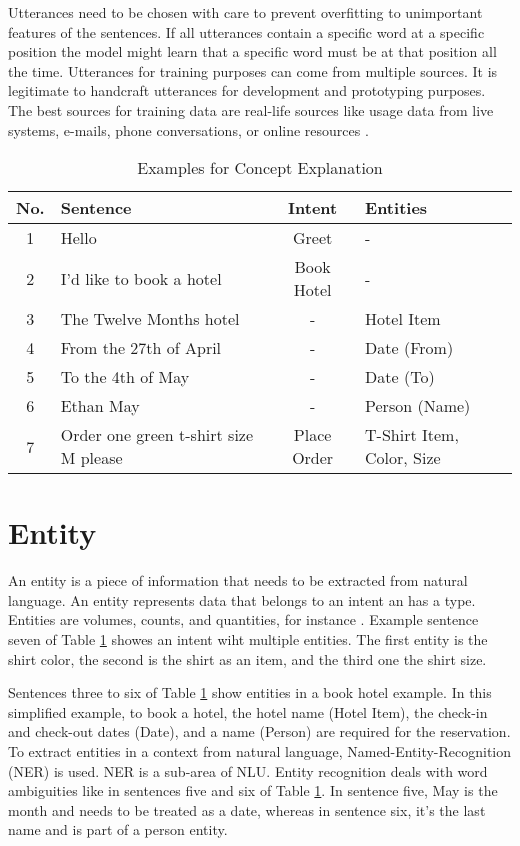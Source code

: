 Utterances need to be chosen with care to prevent overfitting to unimportant features of the sentences.
If all utterances contain a specific word at a specific position the model 
might learn that a specific word must be at that position all the time.
Utterances for training purposes can come from multiple sources.
It is legitimate to handcraft utterances for development and prototyping purposes.
The best sources for training data are real-life sources like usage data from live systems, e-mails, phone conversations, or online resources \cite{singhbuilding}.    


\begin{table}[H]
    \centering
    \begin{tabular}{ c | l | c | l }
        No. & Sentence & Intent & Entities \\ \hline \hline
        1 & Hello & Greet & - \\ \hline
        2 & I'd like to book a hotel & Book Hotel & - \\ \hline
        3 & The Twelve Months hotel & - & Hotel Item\\ \hline
        4 & From the 27th of April & - & Date (From)\\ \hline
        5 & To the 4th of May & - & Date (To)\\ \hline
        6 & Ethan May & - & Person (Name)\\ \hline
        7 & Order one green t-shirt size M please & Place Order & T-Shirt Item, Color, Size \\ \hline
    \end{tabular}
    \caption{Examples for Concept Explanation} \label{tab:example_sentences}
\end{table} \noindent

\section{Entity} \label{sec:entity}
An entity is a piece of information that needs to be extracted from natural language.
An entity represents data that belongs to an intent an has a type.
Entities are volumes, counts, and quantities, for instance \cite{buiildChatbotsPython}.
Example sentence seven of Table \ref{tab:example_sentences} showes an intent wiht multiple entities.
The first entity is the shirt color,  the second is the shirt as an item, and the third one the shirt size.

Sentences three to six of Table \ref{tab:example_sentences} show entities in a book hotel example.
In this simplified example, to book a hotel, the hotel name (Hotel Item), the check-in and check-out dates (Date), and a name (Person) are required for the reservation.
To extract entities in a context from natural language, Named-Entity-Recognition (NER) is used.
NER is a sub-area of NLU.
Entity recognition deals with word ambiguities like in sentences five and six of Table \ref{tab:example_sentences}.
In sentence five, May is the month and needs to be treated as a date, whereas in sentence six, it's the last name and is part of a person entity. \

